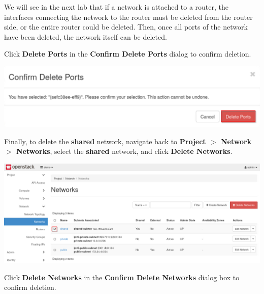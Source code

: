 \documentclass[letterpaper, 12pt]{article}
\begin{document}
\begin{enumerate}
    \begin{tipbox}
        We will see in the next lab that if a network is attached to a router, the interfaces connecting the network to the router must be deleted from the router side, or the entire router could be deleted.
        Then, once all ports of the network have been deleted, the network itself can be deleted.
    \end{tipbox}

    \begin{labstep}
        Click \textbf{Delete Ports} in the \textbf{Confirm Delete Ports} dialog to confirm deletion.

        \begin{center}
            \includegraphics[width=\linewidth]{images/part3/step4.png}
        \end{center}
    \end{labstep}

    \begin{labstep}
        Finally, to delete the \textbf{shared} network, navigate back to \textbf{Project $>$ Network $>$ Networks}, select the \textbf{shared} network, and click \textbf{Delete Networks}.

        \begin{center}
            \includegraphics[width=\linewidth]{images/part3/step5.png}
        \end{center}
    \end{labstep}

    \begin{labstep}
        Click \textbf{Delete Networks} in the \textbf{Confirm Delete Networks} dialog box to confirm deletion.


\end{labstep}
\end{enumerate}
\end{document}
